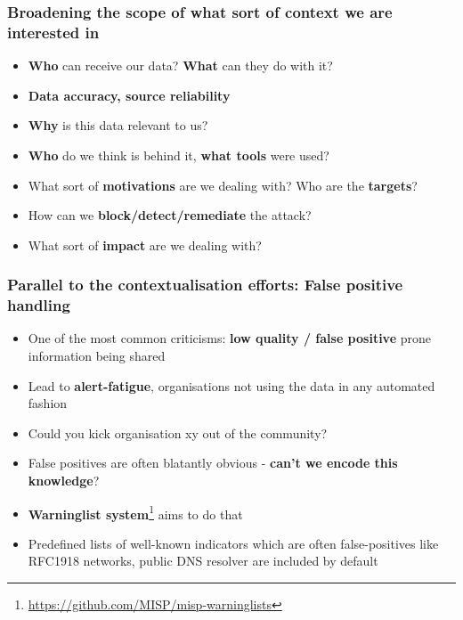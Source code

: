 \begin{frame}
\frametitle{Broadening the scope of what sort of context we are interested in}
\begin{itemize}
       \item {\bf Who} can receive our data? {\bf What} can they do with it?
       \item {\bf Data accuracy, source reliability}
       \item {\bf Why} is this data relevant to us?
       \item {\bf Who} do we think is behind it, {\bf what tools} were used?
       \item What sort of {\bf motivations} are we dealing with? Who are the {\bf targets}?
       \item How can we {\bf block/detect/remediate} the attack?
       \item What sort of {\bf impact} are we dealing with?
\end{itemize}
\end{frame}

\begin{frame}
\frametitle{Parallel to the contextualisation efforts: False positive handling}
\begin{itemize}
        \item One of the most common criticisms: {\bf low quality / false positive} prone information being shared
        \item Lead to {\bf alert-fatigue}, organisations not using the data in any automated fashion
        \item Could you kick organisation xy out of the community?
        \item False positives are often blatantly obvious - {\bf can't we encode this knowledge}?
        \item {\bf Warninglist system}\footnote{\url{https://github.com/MISP/misp-warninglists}} aims to do that
        \item Predefined lists of well-known indicators which are often false-positives like RFC1918 networks, public DNS resolver are included by default
\end{itemize}
\end{frame}


